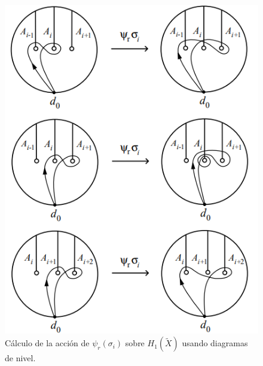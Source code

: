 \documentclass[TFG.tex]{subfiles}
\begin{document}



\begin{figure}[h!]
\includegraphics[scale=0.7]{Imagenes/Burau}
\caption{Cálculo de la acción de $\psi_r(\sigma_i)$ sobre $H_1(\widetilde{X})$ usando diagramas de nivel.}\label{representacion}
\end{figure}
\end{document}
